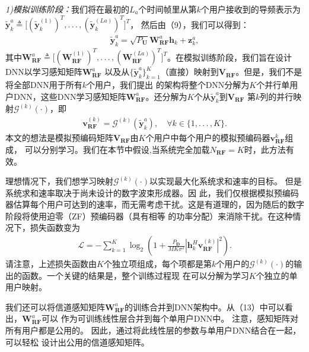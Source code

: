 \documentclass[10pt,journal,final]{IEEEtran}%
\begin{document}
\textit{\fontsize{11pt}{20pt}1)模拟训练阶段：}我们将在最初的$L_{a}$个时间帧里从第$k$个用户接收到的导频表示为$\tilde{\mathbf{y}}_{k}^{a}
\triangleq \biggl[\left(\tilde{\mathbf{y}}_{k}^{(1)}\right)^{T},.\,.\,.\, ,\left(\tilde{\mathbf{y}}_{k}^{(La)}\right)^{T}\biggr]^{T}$，
然后由（9），我们可以得到：
\begin{align}
\tilde{\mathbf{y}}_{k}^{a}=\sqrt{P_{\mathbf{U}}}\mathbf{W}_{\mathbf{RF}}^{a}\mathbf{h}_{k}+\mathbf{z}_{k}^{a}, 
\end{align}
其中$\mathbf{W}_{\mathbf{RF}}^{a}\triangleq\biggl[\left(\mathbf{W}_{\mathbf{RF}}^{(1)}\right)^{T},.\,.\,.\, ,
\left(\mathbf{W}_{\mathbf{RF}}^{(La)}\right)^{T}\biggr]^{T}$。在模拟训练阶段，我们旨在设计DNN以学习感知矩阵$\mathbf{W}_{\mathbf{RF}}^{a}$
以及从$\{\tilde{\mathbf{y}}_{k}^{a}\}_{k=1}^{K}$（直接）映射到$\mathbf{V_{RF}}$。但是，我们不是将全部DNN用于所有$k$个用户，我们提出
的架构将整个DNN分解为$K$个并行单用户DNN，这些DNN学习感知矩阵$\mathbf{W}_{\mathbf{RF}}^{a}$。还分解为$K$个从$\tilde{\mathbf{y}}_{k}^{a}$到$\mathbf{V_{RF}}$
第$k$列的并行映射$\mathcal{G}^{(k)}(\cdot )$，即
\begin{align}
\mathbf{v}_{\mathbf{RF}}^{(k)}=\mathcal{G}^{(k)}(\tilde{\mathbf{y}}_{k}^{a}),\quad \forall k\in \{1,.\,.\,.\, ,K\}.
\end{align}
本文的想法是模拟预编码矩阵$\mathbf{V_{\mathbf{RF}}}$由$K$个用户中每个用户的模拟预编码器$\mathbf{v}_{\mathbf{RF}}^{k}$组成，
可以分别学习。我们在本节中假设,当系统完全加载$N_{\mathbf{RF}}=K$时，此方法有效。

理想情况下，我们想学习映射$\mathcal{G}^{(k)}(\cdot)$以实现最大化系统求和速率的目标。 但是系统求和速率取决于尚未设计的数字波束形成器。因
此，我们仅根据模拟预编码器估算每个用户可达到的速率，而无需考虑干扰。这是有道理的，因为随后的数字阶段将使用迫零（ZF）预编码器（具有相等
的功率分配）来消除干扰。在这种情况下，损失函数变为
\begin{align}
\mathscr{L}=-\sum_{k = 1}^{K}\log_{2}\left(1+\frac{P_{\mathbf{D}}}{MK\sigma^{2}} \left| \mathbf{h}_{k}^{H}\mathbf{v}_{\mathbf{RF}}^{(k)}\right|  ^{2} \right).  
\end{align}
请注意，上述损失函数由$K$个独立项组成，每个项都是第$k$个用户的$\mathcal{G}^{(k)}(\cdot )$的输出的函数。一个关键的结果是，整个训练过程现
在可以分解为学习$K$个独立的单用户映射。

我们还可以将信道感知矩阵$\mathbf{W}_{\mathbf{RF}}^{a}$的训练合并到DNN架构中。从（13）中可以看出，$\mathbf{W}_{\mathbf{RF}}^{a}$可以
作为可训练线性层合并到每个单用户DNN中。 注意，感知矩阵对所有用户都是公用的。 因此，通过将此线性层的参数与单用户DNN结合在一起，可以轻松
设计出公用的信道感知矩阵。
\end{document}
